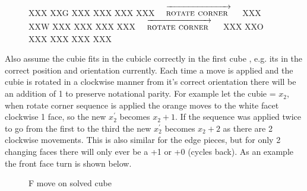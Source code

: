 \documentclass{article}
\begin{document}
\newcommand{\rotatecorner}{[rotatecorner],F2,F2}%
\newcommand{\rotatecornerarr}{$\quad\overrightarrow{\strut\textsc{rotate corner }}\quad$}
\begin{figure}[hbt]
\centering
  \RubikCubeSolved%
   {X}{X}{X} {X}{X}{G}%
   {X}{X}{X} {X}{X}{X}%
   {X}{X}{X} {X}{X}{X}%
  \rotatecornerarr
  \RubikRotation{\rotatecorner}
   {X}{X}{X} {X}{X}{W}%
   {X}{X}{X} {X}{X}{X}%
   {X}{X}{X} {X}{X}{X}%
  \rotatecornerarr
   {X}{X}{X} {X}{X}{O}%
   {X}{X}{X} {X}{X}{X}%
   {X}{X}{X} {X}{X}{X}%
\end{figure}
\vspace{20pt}
Also assume the cubie fits in the cubicle correctly in the first cube , e.g. its in the correct position and orientation currently. Each time a move is applied and the cubie is rotated in a clockwise manner from it's correct orientation there will be an addition of 1 to preserve notational parity. For example let the cubie = $x_2$, when rotate corner sequence is applied the orange moves to the white facet clockwise 1 face, so the new $x_2^{'}$ becomes $x_2 + 1$. If the sequence was applied twice to go from the first to the third the new $x_2^{'}$ becomes $x_2 + 2$ as there are 2 clockwise movements. This is also similar for the edge pieces, but for only 2 changing faces there will only ever be a +1 or +0 (cycles back).
As an example the front face turn is shown below.





\begin{figure}[hbt]
\centering
\RubikCubeSolvedWY
\RubikRotation{\sixspot}
%
\hspace{.5cm}
\caption{F move on solved cube}
\end{figure}
\end{document}
